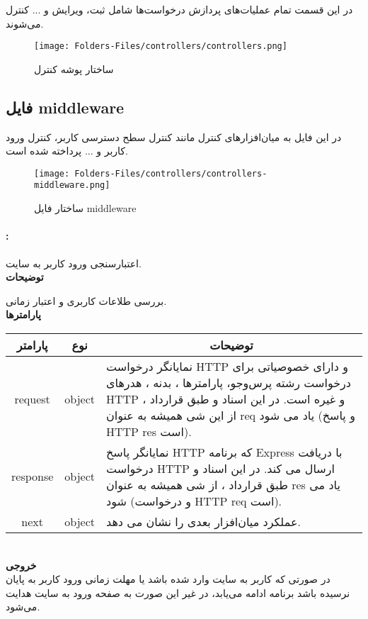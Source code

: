 
در این قسمت تمام عملیات‌های پردازش درخواست‌ها شامل ثبت، ویرایش و ... کنترل می‌شوند.

\begin{figure}[H]
	\texttt{[image: Folders-Files/controllers/controllers.png]}
	\centering
	\caption{ساختار پوشه کنترل}
	\label{fig:folder:controllers}
\end{figure}

\subsection{فایل middleware}
در این فایل به میان‌افزارهای کنترل‌ مانند کنترل سطح دسترسی کاربر، کنترل ورود کاربر و ... پرداخته شده است.
\begin{figure}[H]
	\texttt{[image: Folders-Files/controllers/controllers-middleware.png]}
	\centering
	\caption{ساختار فایل middleware}
	\label{fig:file:controllers:middleware}
\end{figure}

\paragraph{:}
اعتبارسنجی ورود کاربر به سایت.
\\
\textbf{توضیحات}
\hr
\begin{flushleft}
	\framebox[.9\textwidth][l]{
		\lr{
			\textcolor{type}{void}
			\textcolor{func}{logInChecker}
			\textcolor{symb}{(}
			\textcolor{type}{object}
			\textcolor{arg}{request}
			\textcolor{symb}{,}
			\textcolor{type}{object}
			\textcolor{arg}{response}
			\textcolor{symb}{,}
			\textcolor{type}{object}
			\textcolor{arg}{next}
			\textcolor{symb}{);}
		}
	}
\end{flushleft}
بررسی طلاعات کاربری و اعتبار زمانی.
\\
\textbf{پارامترها}
\hr \\[10pt]
\begin{tabular}{|m{4cm}|m{3cm}|m{10cm}|}
	\hline
	\multicolumn{1}{|c}{پارامتر}
	&
	\multicolumn{1}{|c}{نوع}
	&
	\multicolumn{1}{|c|}{توضیحات}
	\\
	\hline
	\multicolumn{1}{|c}{request}
	&
	\multicolumn{1}{|c|}{object}
	&
	نمایانگر درخواست HTTP و دارای خصوصیاتی برای درخواست رشته پرس‌و‌جو، پارامترها ، بدنه ، هدرهای HTTP و غیره است.
	در این اسناد و طبق قرارداد ، از این شی همیشه به عنوان req یاد می شود (و پاسخ HTTP res است).
	\\
	\hline
	\multicolumn{1}{|c}{response}
	&
	\multicolumn{1}{|c|}{object}
	&
	نمایانگر پاسخ HTTP که برنامه Express با دریافت درخواست HTTP ارسال می کند.
	در این اسناد و طبق قرارداد ، از شی همیشه به عنوان res یاد می شود (و درخواست HTTP req است).
	\\
	\hline
	\multicolumn{1}{|c}{next}
	&
	\multicolumn{1}{|c|}{object}
	&
عملکرد میان‌افزار بعدی را نشان می دهد.
	\\
	\hline
\end{tabular}
\\[10pt]
\textbf{خروجی}
\hr \\
در صورتی که کاربر به سایت وارد شده باشد یا مهلت زمانی ورود کاربر به پایان نرسیده باشد برنامه ادامه می‌یابد، در غیر این صورت به صفحه ورود به سایت هدایت می‌شود.

